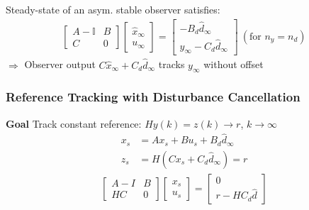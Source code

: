 \begin{lemma}
	Steady-state of an asym. stable
	observer satisfies:
	\begin{align*}
		\begin{bmatrix}
			A-\mathbb{I} & B \\
			C            & 0
		\end{bmatrix}
		\begin{bmatrix}
			\hat{x}_\infty \\
			u_\infty
		\end{bmatrix}
		=
		\begin{bmatrix}
			-B_d \hat{d}_\infty \\
			y_\infty - C_d \hat{d}_\infty
		\end{bmatrix}
		\ (\text{for }n_y = n_d)
	\end{align*}
	$\Rightarrow$ Observer output $C\hat{x}_\infty + C_d \hat{d}_\infty$ tracks $y_\infty$ without offset
\end{lemma}

\subsubsection{Reference Tracking with Disturbance Cancellation}


\textbf{Goal}
Track constant reference:
$Hy(k) = z(k) \to r$, $k\to\infty$
%
\begin{align*}
	x_s & = Ax_s + Bu_s +B_d\hat{d}_\infty  \\
	z_s & = H(Cx_s + C_d\hat{d}_\infty) = r
\end{align*}
\begin{align*}
	\begin{bmatrix}
		A-I & B \\
		HC  & 0
	\end{bmatrix}
	\begin{bmatrix}
		x_s \\
		u_s
	\end{bmatrix}
	=
	\begin{bmatrix}
		0 \\
		r-HC_d\hat{d}
	\end{bmatrix}
\end{align*}
%



